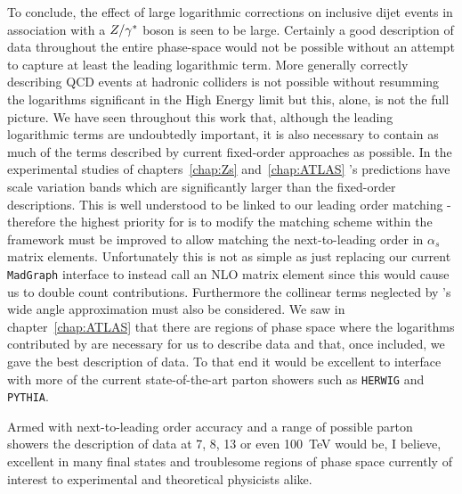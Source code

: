 To conclude, the effect of large logarithmic corrections on inclusive dijet events in association
with a $Z/\gamma^*$ boson is seen to be large.  Certainly a good description of data throughout the entire
phase-space would not be possible without an attempt to capture at least the leading logarithmic term.
More generally correctly describing QCD events at hadronic colliders is not possible without resumming
the logarithms significant in the High Energy limit but this, alone, is not the full picture.  We have
seen throughout this work that, although the leading logarithmic terms are undoubtedly important, it is
also necessary to contain as much of the terms described by current fixed-order approaches as possible.
In the experimental studies of chapters~\ref{chap:Zs} and~\ref{chap:ATLAS} \HEJ's predictions have
scale variation bands which are significantly larger than the fixed-order descriptions.  This is well
understood to be linked to our leading order matching - therefore the highest priority for \hej is to
modify the matching scheme within the \hej framework must be improved to allow matching the next-to-leading
order in $\alpha_s$ matrix elements.  Unfortunately this is not as simple as just replacing our current
\texttt{MadGraph} interface to instead call an NLO matrix element since this would cause us to double
count contributions.  Furthermore the collinear terms neglected by \hej's wide angle approximation must
also be considered.  We saw in chapter~\ref{chap:ATLAS} that there are regions of phase space where the
logarithms contributed by \ARIADNE are necessary for us to describe data and that, once included, we gave
the best description of data.  To that end it would be excellent to interface \HEJ with more of the current
state-of-the-art parton showers such as \texttt{HERWIG} and \texttt{PYTHIA}.

Armed with next-to-leading
order accuracy and a range of possible parton showers the description of data at 7, 8, 13 or even 100~TeV
would be, I believe, excellent in many final states and troublesome regions of phase space currently of
interest to experimental and theoretical physicists alike.


